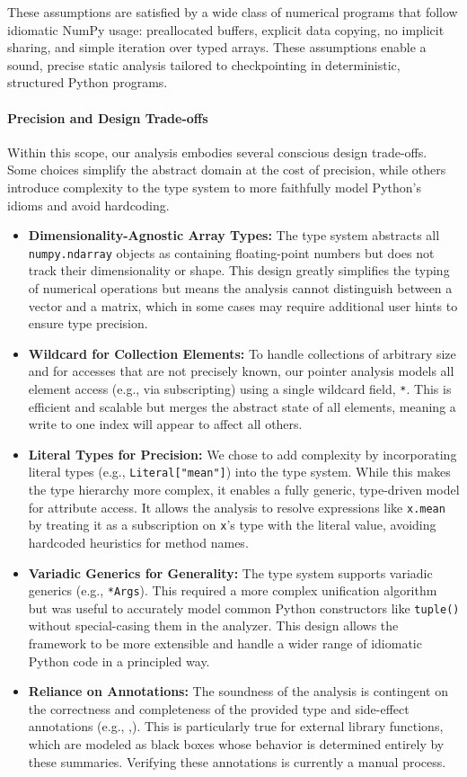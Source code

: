 These assumptions are satisfied by a wide class of numerical programs that follow idiomatic NumPy usage: preallocated buffers, explicit data copying, no implicit sharing, and simple iteration over typed arrays. These assumptions enable a sound, precise static analysis tailored to checkpointing in deterministic, structured Python programs.

\paragraph{Precision and Design Trade-offs}
Within this scope, our analysis embodies several conscious design trade-offs. Some choices simplify the abstract domain at the cost of precision, while others introduce complexity to the type system to more faithfully model Python's idioms and avoid hardcoding.
\begin{itemize}
    \item \textbf{Dimensionality-Agnostic Array Types:} The type system abstracts all \texttt{numpy.ndarray} objects as containing floating-point numbers but does not track their dimensionality or shape. This design greatly simplifies the typing of numerical operations but means the analysis cannot distinguish between a vector and a matrix, which in some cases may require additional user hints to ensure type precision.
    \item \textbf{Wildcard for Collection Elements:} To handle collections of arbitrary size and for accesses that are not precisely known, our pointer analysis models all element access (e.g., via subscripting) using a single wildcard field, \texttt{*}. This is efficient and scalable but merges the abstract state of all elements, meaning a write to one index will appear to affect all others.
    \item \textbf{Literal Types for Precision:} We chose to add complexity by incorporating literal types (e.g., \texttt{Literal["mean"]}) into the type system. While this makes the type hierarchy more complex, it enables a fully generic, type-driven model for attribute access. It allows the analysis to resolve expressions like \texttt{x.mean} by treating it as a subscription on \texttt{x}'s type with the literal value, avoiding hardcoded heuristics for method names.
    \item \textbf{Variadic Generics for Generality:} The type system supports variadic generics (e.g., \texttt{*Args}). This required a more complex unification algorithm but was useful to accurately model common Python constructors like \texttt{tuple()} without special-casing them in the analyzer. This design allows the framework to be more extensible and handle a wider range of idiomatic Python code in a principled way.
    \item \textbf{Reliance on Annotations:} The soundness of the analysis is contingent on the correctness and completeness of the provided type and side-effect annotations (e.g., \tnew,\tupdate). This is particularly true for external library functions, which are modeled as black boxes whose behavior is determined entirely by these summaries. Verifying these annotations is currently a manual process.
\end{itemize}

